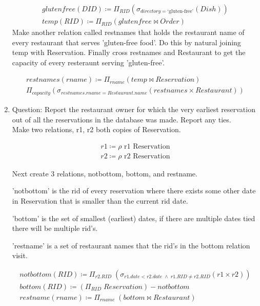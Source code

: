 \documentclass{article}
\begin{document}
\begin{enumerate}
		\begin{align}
        glutenfree(DID) \coloneqq \Pi_{RID} (\sigma_{directory = \text{‘gluten-free’}}(Dish))\\
        temp(RID) \coloneqq \Pi_{RID} (glutenfree \bowtie Order)
		\end{align} 
	Make another relation called restnames that holds the restaurant name of every restaurant that serves 'gluten-free food'. Do this by natural joining temp with Reservation. 
	Finally cross restnames and Restaurant to get the capacity of every resteraunt serving 'gluten-free'.
	
	\begin{align}
         restnames(rname) \coloneqq \Pi_{rname} (temp \bowtie Reservation)\\
         \Pi_{capacity} (\sigma_{restnames.rname = Restaurant.name} (restnames \times Restaurant))
		\end{align} 
	
\item%
Question: Report the restaurant owner for which the very earliest reservation out of all the reservations in the
database was made. Report any ties.\\

Make two relations, r1, r2 both copies of Reservation. 

 		\begin{align}
        r1 \coloneqq \rho \text{  r1 Reservation}  \\
        r2 \coloneqq \rho \text{  r2 Reservation}
		\end{align}
	
Next create 3 relations, notbottom, bottom, and restname.

'notbottom' is the rid of every reservation where there exists some other date in Reservation that is smaller than the current rid date.

'bottom' is the set of smallest (earliest) dates, if there are multiple dates tied there will be multiple rid's.

'restname' is a set of restaurant names that the rid's in the bottom relation visit.

		\begin{align}
         notbottom(RID) \coloneqq \Pi_{r2.RID} \; (\sigma_{r1.date < r2.date \; \wedge  \; r1.RID \neq r2.RID} (r1 \times r2))\\
         bottom(RID)\coloneqq (\Pi_{RID} \; Reservation) - notbottom\\
         restname(rname) \coloneqq \Pi_{rname} \;(bottom \bowtie Restaurant)
		\end{align} 
		

\end{enumerate}
\end{document}
